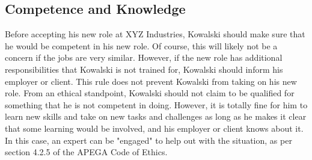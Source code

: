 \documentclass[letterpaper,12pt]{article}
\begin{document}
\subsection{Competence and Knowledge}
Before accepting his new role at XYZ Industries, Kowalski should make sure that he would be competent in his new role.
Of course, this will likely not be a concern if the jobs are very similar. However, if the new role has additional responsibilities that Kowalski
is not trained for, Kowalski should inform his employer or client. This rule does not prevent Kowalski from taking on his new role. From an ethical standpoint,
Kowalski should not claim to be qualified for something that he is not competent in doing. However, it is totally fine for him to learn new skills and take on
new tasks and challenges as long as he makes it clear that some learning would be involved, and his employer or client knows about it. 
In this case, an expert can be "engaged" to help out with the situation, as per section 4.2.5 of the APEGA Code of Ethics.\cite{apegacode}
\end{document}
